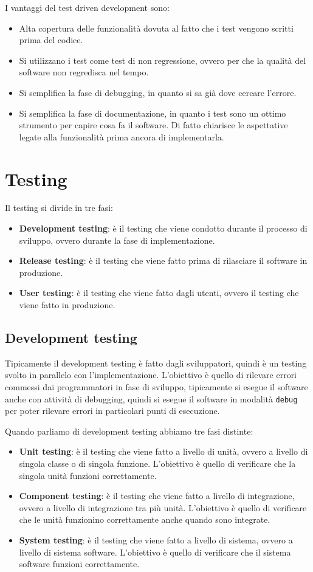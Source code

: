 I vantaggi del test driven development sono:
\begin{itemize}
    \item Alta copertura delle funzionalità dovuta al fatto che i test vengono
    scritti prima del codice.
    \item Si utilizzano i test come test di non regressione, ovvero per che 
    la qualità del software non regredisca nel tempo.
    \item Si semplifica la fase di debugging, in quanto si sa già dove cercare
    l'errore.
    \item Si semplifica la fase di documentazione, in quanto i test sono un ottimo
    strumento per capire cosa fa il software. Di fatto chiarisce le aspettative
    legate alla funzionalità prima ancora di implementarla.
\end{itemize}
\section{Testing}
Il testing si divide in tre fasi:
\begin{itemize}
    \item \textbf{Development testing}: è il testing che viene condotto durante
    il processo di sviluppo, ovvero durante la fase di implementazione.
    \item \textbf{Release testing}: è il testing che viene fatto prima di rilasciare
    il software in produzione.
    \item \textbf{User testing}: è il testing che viene fatto dagli utenti, ovvero
    il testing che viene fatto in produzione.
\end{itemize}

\subsection{Development testing}
Tipicamente il development testing è fatto dagli sviluppatori, quindi è un testing
svolto in parallelo con l'implementazione. L'obiettivo è quello di rilevare errori
commessi dai programmatori in fase di sviluppo, tipicamente si esegue il software 
anche con attività di debugging, quindi si esegue il software in modalità \texttt{debug}
per poter rilevare errori in particolari punti di esecuzione.

Quando parliamo di development testing abbiamo tre fasi distinte:
\begin{itemize}
    \item \textbf{Unit testing}: è il testing che viene fatto a livello di unità, 
    ovvero a livello di singola classe o di singola funzione. L'obiettivo è quello
    di verificare che la singola unità funzioni correttamente.
    \item \textbf{Component testing}: è il testing che viene fatto a livello di 
    integrazione, ovvero a livello di integrazione tra più unità. L'obiettivo è quello
    di verificare che le unità funzionino correttamente anche quando sono integrate.
    \item \textbf{System testing}: è il testing che viene fatto a livello di sistema,
    ovvero a livello di sistema software. L'obiettivo è quello di verificare che il 
    sistema software funzioni correttamente.
\end{itemize}
